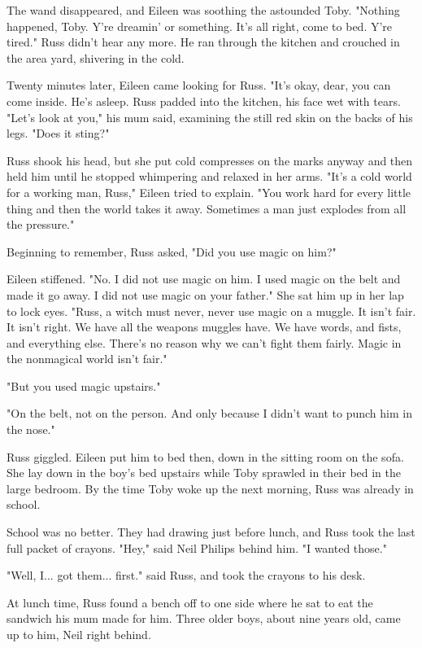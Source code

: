 \documentclass[a4paper,11pt]{article}
\begin{document}
The wand disappeared, and Eileen was soothing the astounded Toby. "Nothing happened, Toby. Y're dreamin' or something. It's all right, come to bed. Y're tired." Russ didn't hear any more. He ran through the kitchen and crouched in the area yard, shivering in the cold.

Twenty minutes later, Eileen came looking for Russ. "It's okay, dear, you can come inside. He's asleep. Russ padded into the kitchen, his face wet with tears. "Let's look at you," his mum said, examining the still red skin on the backs of his legs. "Does it sting?"

Russ shook his head, but she put cold compresses on the marks anyway and then held him until he stopped whimpering and relaxed in her arms. "It's a cold world for a working man, Russ," Eileen tried to explain. "You work hard for every little thing and then the world takes it away. Sometimes a man just explodes from all the pressure."

Beginning to remember, Russ asked, "Did you use magic on him?"

Eileen stiffened. "No. I did not use magic on him. I used magic on the belt and made it go away. I did not use magic on your father." She sat him up in her lap to lock eyes. "Russ, a witch must never, never use magic on a muggle. It isn't fair. It isn't right. We have all the weapons muggles have. We have words, and fists, and everything else. There's no reason why we can't fight them fairly. Magic in the nonmagical world isn't fair."

"But you used magic upstairs."

"On the belt, not on the person. And only because I didn't want to punch him in the nose."

Russ giggled. Eileen put him to bed then, down in the sitting room on the sofa. She lay down in the boy's bed upstairs while Toby sprawled in their bed in the large bedroom. By the time Toby woke up the next morning, Russ was already in school.

School was no better. They had drawing just before lunch, and Russ took the last full packet of crayons. "Hey," said Neil Philips behind him. "I wanted those."

"Well, I... got them... first." said Russ, and took the crayons to his desk.

At lunch time, Russ found a bench off to one side where he sat to eat the sandwich his mum made for him. Three older boys, about nine years old, came up to him, Neil right behind.
\end{document}
